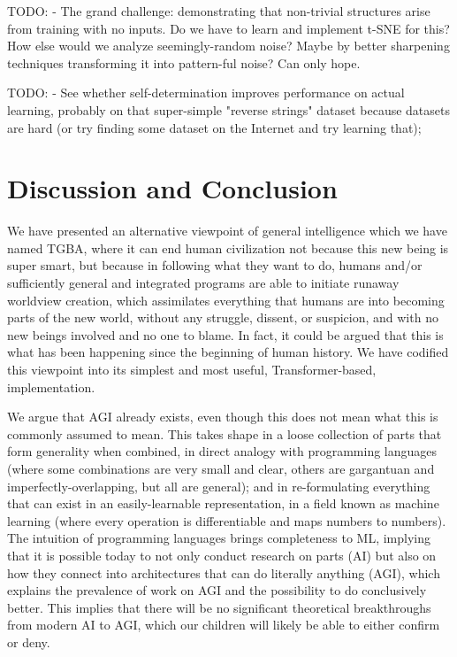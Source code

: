 \documentclass{article}
\begin{document}
    TODO: - The grand challenge: demonstrating that non-trivial structures arise from training with no inputs. Do we have to learn and implement t-SNE for this? How else would we analyze seemingly-random noise? Maybe by better sharpening techniques transforming it into pattern-ful noise? Can only hope.

    TODO: - See whether self-determination improves performance on actual learning, probably on that super-simple "reverse strings" dataset because datasets are hard (or try finding some dataset on the Internet and try learning that);

\section{Discussion and Conclusion}

We have presented an alternative viewpoint of general intelligence which we have named TGBA, where it can end human civilization not because this new being is super smart, but because in following what they want to do, humans and/or sufficiently general and integrated programs are able to initiate runaway worldview creation, which assimilates everything that humans are into becoming parts of the new world, without any struggle, dissent, or suspicion, and with no new beings involved and no one to blame. In fact, it could be argued that this is what has been happening since the beginning of human history. We have codified this viewpoint into its simplest and most useful, Transformer-based, implementation.

We argue that AGI already exists, even though this does not mean what this is commonly assumed to mean. This takes shape in a loose collection of parts that form generality when combined, in direct analogy with programming languages (where some combinations are very small and clear, others are gargantuan and imperfectly-overlapping, but all are general); and in re-formulating everything that can exist in an easily-learnable representation, in a field known as machine learning (where every operation is differentiable and maps numbers to numbers). The intuition of programming languages brings completeness to ML, implying that it is possible today to not only conduct research on parts (AI) but also on how they connect into architectures that can do literally anything (AGI), which explains the prevalence of work on AGI and the possibility to do conclusively better. This implies that there will be no significant theoretical breakthroughs from modern AI to AGI, which our children will likely be able to either confirm or deny.
\end{document}
